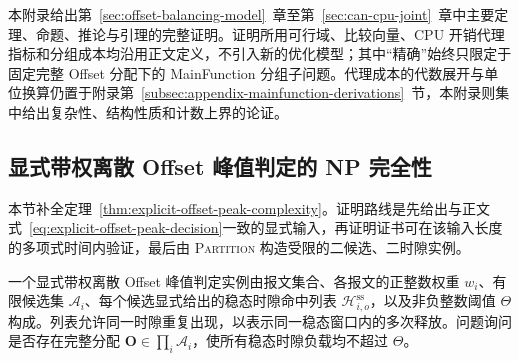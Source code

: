 \documentclass[UTF8,a4paper,twoside,zihao=-4]{ctexart}
\numberwithin{equation}{section}
\numberwithin{figure}{section}
\numberwithin{table}{section}
\theoremstyle{definition}
\newcommand{\Oset}{\mathcal{A}}
\newcommand{\Hset}{\mathcal{H}}
\numberwithin{algocf}{section}
\begin{document}
本附录给出第~\ref{sec:offset-balancing-model}~章至第~\ref{sec:can-cpu-joint}~章中主要定理、命题、推论与引理的完整证明。证明所用可行域、比较向量、CPU 开销代理指标和分组成本均沿用正文定义，不引入新的优化模型；其中“精确”始终只限定于固定完整 Offset 分配下的 MainFunction 分组子问题。代理成本的代数展开与单位换算仍置于附录第~\ref{subsec:appendix-mainfunction-derivations}~节，本附录则集中给出复杂性、结构性质和计数上界的论证。

\subsection{显式带权离散 Offset 峰值判定的 NP 完全性}
\label{subsec:appendix-explicit-peak-proof}

本节补全定理~\ref{thm:explicit-offset-peak-complexity}。证明路线是先给出与正文式~\eqref{eq:explicit-offset-peak-decision}一致的显式输入，再证明证书可在该输入长度的多项式时间内验证，最后由 \textsc{Partition} 构造受限的二候选、二时隙实例。

一个显式带权离散 Offset 峰值判定实例由报文集合、各报文的正整数权重 $w_i$、有限候选集 $\Oset_i$、每个候选显式给出的稳态时隙命中列表 $\Hset_{i,o}^{\mathrm{ss}}$，以及非负整数阈值 $\Theta$ 构成。列表允许同一时隙重复出现，以表示同一稳态窗口内的多次释放。问题询问是否存在完整分配 $\boldsymbol O\in\prod_i\Oset_i$，使所有稳态时隙负载均不超过 $\Theta$。
\end{document}
